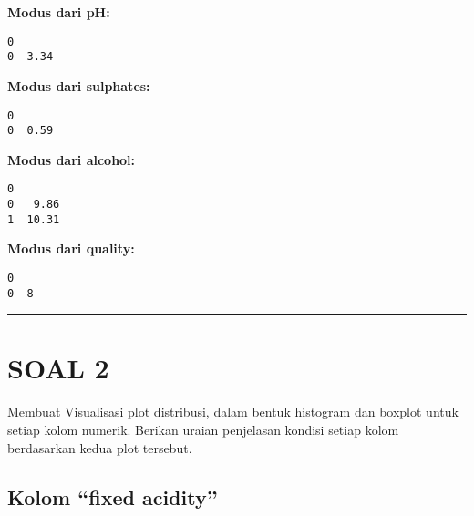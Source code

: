 \documentclass[11pt]{article}
\begin{document}
    
    \textbf{Modus dari pH:}

    
    
    \begin{Verbatim}[commandchars=\\\{\}]
      0
0  3.34
    \end{Verbatim}

    
    \textbf{Modus dari sulphates:}

    
    
    \begin{Verbatim}[commandchars=\\\{\}]
      0
0  0.59
    \end{Verbatim}

    
    \textbf{Modus dari alcohol:}

    
    
    \begin{Verbatim}[commandchars=\\\{\}]
       0
0   9.86
1  10.31
    \end{Verbatim}

    
    \textbf{Modus dari quality:}

    
    
    \begin{Verbatim}[commandchars=\\\{\}]
   0
0  8
    \end{Verbatim}

    
    \begin{center}\rule{0.5\linewidth}{0.5pt}\end{center}

    \hypertarget{soal-2}{%
\section{SOAL 2}\label{soal-2}}

    Membuat Visualisasi plot distribusi, dalam bentuk histogram dan boxplot
untuk setiap kolom numerik. Berikan uraian penjelasan kondisi setiap
kolom berdasarkan kedua plot tersebut.

    \hypertarget{kolom-fixed-acidity}{%
\subsection{Kolom ``fixed acidity''}\label{kolom-fixed-acidity}}
\end{document}
